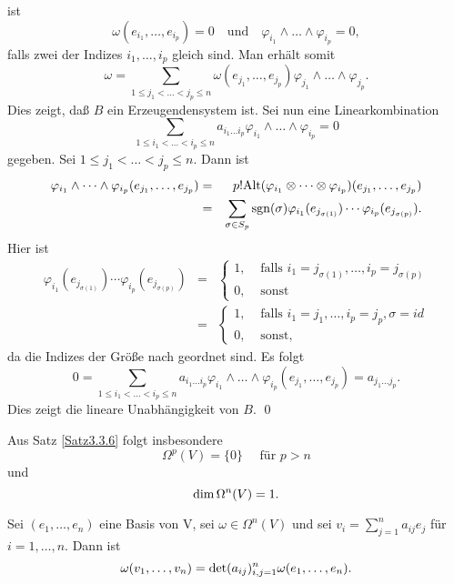 \documentclass[a4paper,twoside,DIV15,BCOR12mm]{scrbook}
\DeclareMathOperator{\sgn}{sgn}
\begin{document}
ist
\[\omega(e_{i_1},\dots,e_{i_p})=0\quad\text{und}\quad \varphi_{i_1} 
\wedge \dots \wedge \varphi_{i_p}=0,\]
falls zwei der Indizes $i_{1},\dots,i_{p}$ gleich sind. Man erhält somit
\[ \omega = \sum_{1 \le j_{1} < \dots < j_{p} \le n} 
\omega(e_{j_1},\dots,e_{j_p}) \varphi_{j_1} \wedge \dots \wedge 
\varphi_{j_p}. \]
Dies zeigt, daß $B$ ein Erzeugendensystem ist. Sei nun eine 
Linearkombination
\[ \sum_{1 \le i_{1} < \dots < i_{p} \le n} a_{i_{1} \dots i_{p}} 
\varphi_{i_1} \wedge \dots \wedge \varphi_{i_p} = 0 \]
gegeben. Sei $1 \le j_{1} < \dots < j_{p} \le n$. Dann ist
\begin{eqnarray*}
\varphi_{i_1} \wedge \dots \wedge 
\varphi_{i_p}(e_{j_1},\dots,e_{j_p}) 
& = & p! {\rm Alt}(\varphi_{i_1} \otimes \dots \otimes 
\varphi_{i_p}) (e_{j_1},\dots,e_{j_p}) \\
& = & \sum_{\sigma \in S_{p}} \sgn (\sigma) 
\varphi_{i_1}(e_{j_{\sigma(1)}}) \cdots \varphi_{i_p} 
(e_{j_{\sigma(p)}}).
\end{eqnarray*}
Hier ist
\begin{eqnarray*}
\varphi_{i_1}(e_{j_{\sigma(1)}}) \cdots 
\varphi_{i_p}(e_{j_{\sigma(p)}}) & = & \left\{ \begin{array}{ll} 1, & 
\mbox{ falls } i_{1} = j_{\sigma(1)},\dots,i_{p} = j_{\sigma(p)} \\
0, & \mbox{ sonst} \end{array} \right. \\
& = & \left\{ \begin{array}{ll} 1, & \mbox{ falls } i_{1} = 
j_{1},\dots,i_{p} = j_{p}, \sigma = id \\ 0, & \mbox{ sonst,} 
\end{array} \right.
\end{eqnarray*}
da die Indizes der Größe nach geordnet sind. Es folgt
\[ 0 = \sum_{1 \le i_{1} < \dots < i_{p} \le n} a_{i_{1}\dots i_{p}} 
\varphi_{i_1} \wedge \dots \wedge 
\varphi_{i_p}(e_{j_1},\dots,e_{j_p}) = a_{j_{1}\dots j_{p}}. \]
Dies zeigt die lineare Unabhängigkeit von $B$. \qed\\

\bigskip

\noindent
Aus Satz \ref{Satz3.3.6} folgt insbesondere
\[ \Omega^{p}(V) = \{0\} \quad \mbox{ für } p > n \]
und
\[ {\rm dim}\, \Omega^{n}(V) = 1. \]

\bigskip

\begin{satz}\label{Satz3.3.7} {Sei $(e_{1},\dots,e_{n})$ eine Basis 
von V, sei $\omega \in \Omega^{n}(V)$ und sei $v_{i} = 
\sum_{j=1}^{n}a_{ij}e_{j}$ für $i = 1,\dots,n$. Dann ist}
\[ \omega(v_{1},\dots,v_{n}) = {\rm det}(a_{ij})_{i,j=1}^{n} 
\omega(e_{1},\dots,e_{n}). \]
\end{satz}
\end{document}
